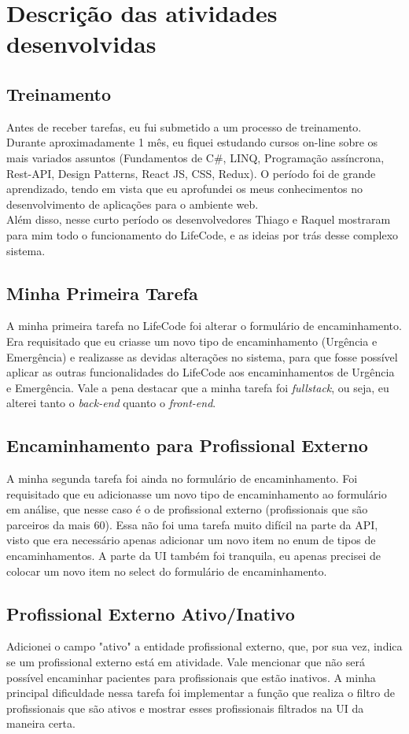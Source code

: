 \documentclass[12pt]{article}
\begin{document}
\section{Descrição das atividades desenvolvidas}
\subsection{Treinamento}
Antes de receber tarefas, eu fui submetido a um processo de treinamento. Durante aproximadamente 1 mês, eu fiquei estudando cursos on-line sobre os mais variados assuntos (Fundamentos de C\#, LINQ, Programação assíncrona, Rest-API, Design Patterns, React JS, CSS, Redux). O período foi de grande aprendizado, tendo em vista que eu aprofundei	 os meus conhecimentos no 
desenvolvimento de aplicações para o ambiente web.
\\
Além disso, nesse curto período os desenvolvedores Thiago e Raquel mostraram para mim todo o funcionamento do LifeCode, e as ideias por trás desse complexo sistema.


\subsection{Minha Primeira Tarefa}
A minha primeira tarefa no LifeCode foi alterar o formulário de encaminhamento. Era requisitado que eu criasse um novo tipo de encaminhamento (Urgência e Emergência) e realizasse as devidas alterações no sistema, para que fosse possível aplicar as outras funcionalidades do LifeCode aos encaminhamentos de Urgência e Emergência. Vale a pena destacar que a minha tarefa foi \emph{fullstack}, ou seja, eu alterei tanto o \emph{back-end} quanto o \emph{front-end}.


\subsection{Encaminhamento para Profissional Externo}
A minha segunda tarefa foi ainda no formulário de encaminhamento. Foi requisitado que eu adicionasse um novo tipo de encaminhamento ao formulário em análise, que nesse caso é o de profissional externo (profissionais que são parceiros da mais 60). Essa não foi uma tarefa muito difícil na parte da API, visto que era necessário apenas adicionar um novo item no enum de tipos de encaminhamentos. A parte da UI também foi tranquila, eu apenas precisei de colocar um novo item no select do formulário de encaminhamento.


\subsection{Profissional Externo Ativo/Inativo}
Adicionei o campo "ativo" a entidade profissional externo, que, por sua vez, indica se um profissional externo está em atividade. Vale mencionar que não será possível encaminhar pacientes para profissionais que estão inativos. A minha principal dificuldade nessa tarefa foi implementar a função que realiza o filtro de profissionais que são ativos e mostrar esses profissionais filtrados na UI da maneira certa.
\end{document}
